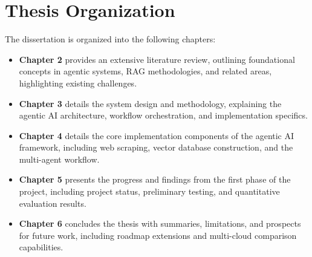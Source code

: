 \section{Thesis Organization}

The dissertation is organized into the following chapters:

\begin{itemize}
    \item \textbf{Chapter 2} provides an extensive literature review, outlining foundational concepts in agentic systems, RAG methodologies, and related areas, highlighting existing challenges.
    \item \textbf{Chapter 3} details the system design and methodology, explaining the agentic AI architecture, workflow orchestration, and implementation specifics.
    \item \textbf{Chapter 4} details the core implementation components of the agentic AI framework, including web scraping, vector database construction, and the multi-agent workflow.
    \item \textbf{Chapter 5} presents the progress and findings from the first phase of the project, including project status, preliminary testing, and quantitative evaluation results.
    \item \textbf{Chapter 6} concludes the thesis with summaries, limitations, and prospects for future work, including roadmap extensions and multi-cloud comparison capabilities.
\end{itemize}